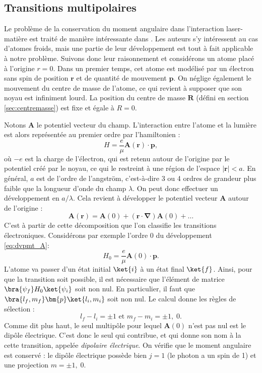 \subsection{Transitions multipolaires}
Le problème de la conservation du moment angulaire dans l'interaction laser-matière est traité de manière intéressante dans . Les auteurs s'y intéressent au cas d'atomes froids, mais une partie de leur développement est tout à fait applicable à notre problème. Suivons donc leur raisonnement et considérons un atome placé à l'origine $r=0$. Dans un premier temps, cet atome est modélisé par un électron sans spin de position $\bm{r}$ et de quantité de mouvement $\bm{p}$. On néglige également le mouvement du centre de masse de l'atome, ce qui revient à supposer que son noyau est infiniment lourd. La position du centre de masse $\bm{R}$ (défini en section \ref{sec:centremasse}) est fixe et égale à $R=0$.\par 
Notons $\bm{A}$ le potentiel vecteur du champ. L'interaction entre l'atome et la lumière est alors représentée au premier ordre par l'hamiltonien :
\begin{equation*}
H = \frac{e}{\mu}\bm{A}(\bm{r})\cdot\bm{p},
\end{equation*}
où $-e$ est la charge de l'électron, qui est retenu autour de l'origine par le potentiel créé par le noyau, ce qui le restreint à une région de l'espace $\left|\bm{r}\right|<a$. En général, $a$ est de l'ordre de l'angström, c'est-à-dire 3 ou 4 ordres de grandeur plus faible que la longueur d'onde du champ $\lambda$. On peut donc effectuer un développement en $a/\lambda$. Cela revient à développer le potentiel vecteur $\bm{A}$ autour de l'origine :
\begin{equation}
\bm{A}(\bm{r}) = \bm{A}(0)+(\bm{r}\cdot\bm{\nabla})\bm{A}(0)+\ldots
\label{eq:dvpmt_A}
\end{equation}
C'est à partir de cette décomposition que l'on classifie les transitions électroniques. Considérons par exemple l'ordre 0 du développement \ref{eq:dvpmt_A}:
\begin{equation*}
H_0 = \frac{e}{\mu}\bm{A}(0)\cdot\bm{p}.
\end{equation*}
L'atome va passer d'un état initial $\ket{i}$ à un état final $\ket{f}$. Ainsi, pour que la transition soit possible, il est nécessaire que l'élément de matrice $\bra{\psi_f}H_0\ket{\psi_i}$ soit non nul. En particulier, il faut que $\bra{l_f,m_f}\bm{p}\ket{l_i,m_i}$ soit non nul. Le calcul donne les règles de sélection  :
\begin{equation*}
l_f-l_i=\pm1\text{ et }m_f-m_i=\pm1,\;0.
\end{equation*}
Comme dit plus haut, le seul multipôle pour lequel $\bm{A}(0)$ n'est pas nul est le dipôle électrique. C'est donc le seul qui contribue, et qui donne son nom à la cette transition, appelée \textit{dipolaire électrique}. On vérifie que le moment angulaire est conservé : le dipôle électrique possède bien $j=1$ (le photon a un spin de 1) et une projection $m=\pm1,\;0$.

